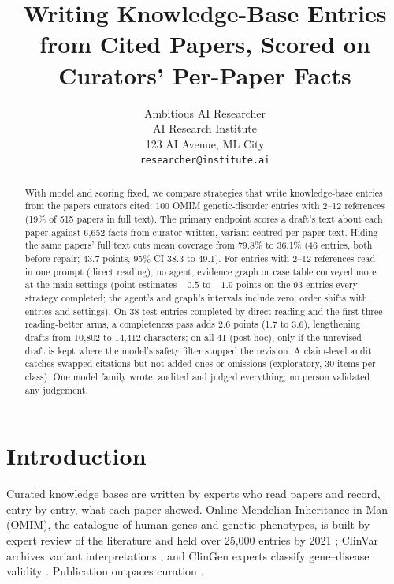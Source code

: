 \documentclass{article} %
\title{Writing Knowledge-Base Entries from Cited Papers, Scored on Curators' Per-Paper Facts}
\author{Ambitious AI Researcher\\
AI Research Institute\\
123 AI Avenue, ML City\\
\texttt{researcher@institute.ai}
}
\begin{document}
\maketitle

\begin{abstract}
With model and scoring fixed, we compare strategies that write knowledge-base entries from the papers curators cited: 100 OMIM genetic-disorder entries with 2--12 references (19\% of 515 papers in full text). The primary endpoint scores a draft's text about each paper against 6,652 facts from curator-written, variant-centred per-paper text. Hiding the same papers' full text cuts mean coverage from 79.8\% to 36.1\% (46 entries, both before repair; 43.7 points, 95\% CI 38.3 to 49.1). For entries with 2--12 references read in one prompt (direct reading), no agent, evidence graph or case table conveyed more at the main settings (point estimates $-0.5$ to $-1.9$ points on the 93 entries every strategy completed; the agent's and graph's intervals include zero; order shifts with entries and settings). On 38 test entries completed by direct reading and the first three reading-better arms, a completeness pass adds 2.6 points (1.7 to 3.6), lengthening drafts from 10,802 to 14,412 characters; on all 41 (post hoc), only if the unrevised draft is kept where the model's safety filter stopped the revision. A claim-level audit catches swapped citations but not added ones or omissions (exploratory, 30 items per class). One model family wrote, audited and judged everything; no person validated any judgement.
\end{abstract}

\section{Introduction}
\label{sec:intro}
Curated knowledge bases are written by experts who read papers and record, entry by entry, what each paper showed. Online Mendelian Inheritance in Man (OMIM), the catalogue of human genes and genetic phenotypes, is built by expert review of the literature and held over 25,000 entries by 2021 \citep{Amberger2014OmimorgOnline,amberger2019omim,hamosh2021online}; ClinVar archives variant interpretations \citep{Landrum2017ClinvarImproving,landrum2025clinvar}, and ClinGen experts classify gene--disease validity \citep{strande2017evaluating}. Publication outpaces curation \citep{caufield2024curategpt,Green2023LitsummLarge}.
\end{document}
